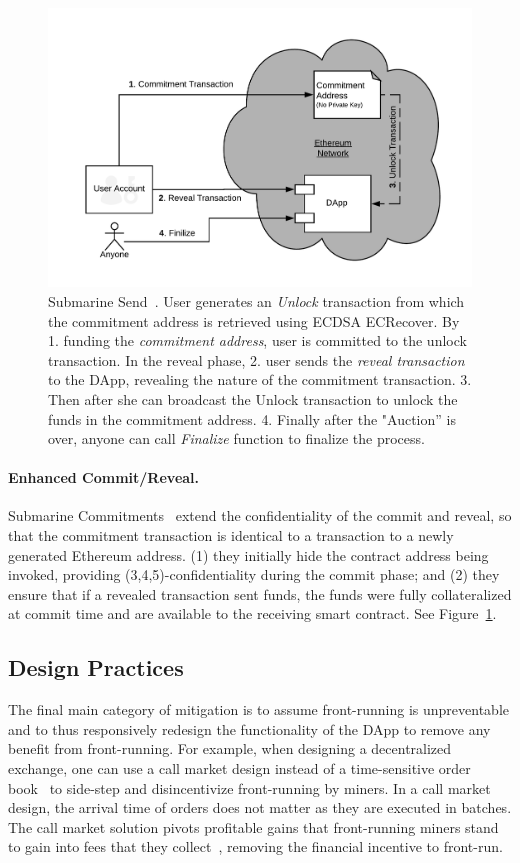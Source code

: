 \begin{figure}[t]
\centering
\includegraphics[width=0.7\linewidth]{figures/LibSubmarine.png}
\caption{Submarine Send~\cite{libsubmarine}. User generates an \textit{Unlock} transaction from which the commitment address is retrieved using ECDSA ECRecover. By \textsf{1.} funding the \textit{commitment address}, user is committed to the unlock transaction. In the reveal phase, \textsf{2.} user sends the \textit{reveal transaction} to the DApp, revealing the nature of the commitment transaction. \textsf{3.} Then after she can broadcast the Unlock transaction to unlock the funds in the commitment address. \textsf{4.} Finally after the "Auction'' is over, anyone can call \textit{Finalize} function to finalize the process.  \label{fig:LibSubmarine}}
\end{figure}

\paragraph{Enhanced Commit/Reveal.} Submarine Commitments~\cite{libsubmarine,submarinesendHD} extend the confidentiality of the commit and reveal, so that the commitment transaction is identical to a transaction to a newly generated Ethereum address. (1) they initially hide the contract address being invoked, providing (3,4,5)-confidentiality during the commit phase; and (2) they ensure that if a revealed transaction sent funds, the funds were fully collateralized at commit time and are available to the receiving smart contract. See Figure~\ref{fig:LibSubmarine}.

\subsection{Design Practices}

The final main category of mitigation is to assume front-running is unpreventable and to thus responsively redesign the functionality of the DApp to remove any benefit from front-running. For example, when designing a decentralized exchange, one can use a call market design instead of a time-sensitive order book~\cite{clark2014decentralizing} to side-step and disincentivize front-running by miners. In a call market design, the arrival time of orders does not matter as they are executed in batches. The call market solution pivots profitable gains that front-running miners stand to gain into fees that they collect~\cite{clark2014decentralizing}, removing the financial incentive to front-run. 

